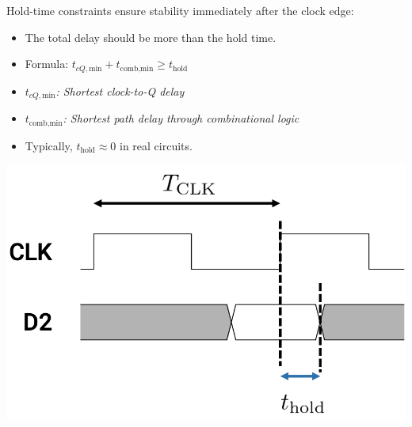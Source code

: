 \documentclass[12pt,openany]{book}
\begin{document}
\begin{center}
    \begin{minipage}{0.5\textwidth}
        Hold-time constraints ensure stability immediately after the clock edge:
        \begin{itemize}
            \item[] The total delay should be more than the hold time.
            \item[] Formula: \( t_{cQ,\text{min}} + t_{\text{comb,min}} \geq t_{\text{hold}} \)
            \item[] \( t_{cQ,\text{min}} \)\textit{: Shortest clock-to-Q delay}            
			\item[] \( t_{\text{comb,min}} \)\textit{: Shortest path delay through combinational logic}
            \item[] Typically, \( t_{\text{hold}} \approx 0 \) in real circuits.
        \end{itemize}
    \end{minipage}
    \hfill
    \begin{minipage}{0.4\textwidth}
        \includegraphics[width=1\textwidth]{circuits/15.1.2_3.png}
    \end{minipage}
\end{center}
\end{document}
